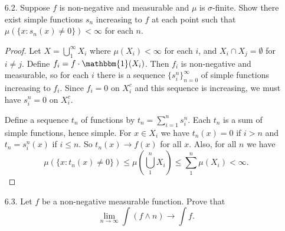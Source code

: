 \documentclass[10pt]{article}
\begin{document}
\begin{enumerate}
\item[6.2.] Suppose $f$ is non-negative and measurable and $\mu$ is $\sigma$-finite.  Show there exist simple functions $s_n$ increasing to $f$ at each point such that $\mu(\{x : s_n(x) \neq 0\}) < \infty$ for each $n$.

\begin{proof}

Let $X = \bigcup_1^\infty X_i$ where $\mu(X_i) < \infty$ for each $i$, and $X_i \cap X_j = \emptyset$ for $i \neq j$.  Define $f_i = f \cdot \mathbbm{1}(X_i)$.  Then $f_i$ is non-negative and measurable, so for each $i$ there is a sequence $\{s_i^n\}_{n=0}^\infty$ of simple functions increasing to $f_i$.  Since $f_i = 0$ on $X_i^c$ and this sequence is increasing, we must have $s_i^n = 0$ on $X_i^c$.

Define a sequence $t_n$ of functions by $t_n = \sum\limits_{i=1}^n s_i^n$.  Each $t_n$ is a sum of simple functions, hence simple.  For $x \in X_i$ we have $t_n(x) = 0$ if $i > n$ and $t_n = s_i^n(x)$ if $i \leq n$.  So $t_n(x) \rightarrow f(x)$ for all $x$.  Also, for all $n$ we have 
$$
\mu(\{x : t_n(x) \neq 0\}) \leq \mu\left(\bigcup_1^n X_i \right) \leq \sum_1^n \mu(X_i) < \infty.
$$

\end{proof}

\item[6.3.] Let $f$ be a non-negative measurable function.  Prove that
$$
\lim_{n\rightarrow \infty} \int(f \wedge n) \rightarrow \int f.
$$
\begin{comment}
\begin{proof}
Let $s_n$ be an increasing sequence of simple functions converging to $f$, and let $x \in X$, $\epsilon > 0$.  There is some $N > 0$ such that $n > N$ implies $|s_n(x) - f(x)| < \epsilon$.  Let $N' = N \vee f(x)$, and suppose $n > N'$.  We have $s_n(x) \leq f(x) < n$, so $f(x) \wedge n = f(x)$ and $s_n(x) \wedge n = s_n(x)$.  Thus, $|(s_n(x) \wedge n) - (f(x) \wedge n)| = |s_n(x) -f(x)| < \epsilon$.  So $s_n \wedge n \rightarrow f \wedge n$.

Now, for each $n$, one of the following chains of inequalities must hold:
$$
n \leq s_n(x) \leq f(x), \hspace{1cm} s_n(x) \leq n \leq f(x), \hspace{1cm} s_n(x) \leq f(x) \leq n
$$
\end{proof}
\end{comment}


\end{enumerate}
\end{document}
